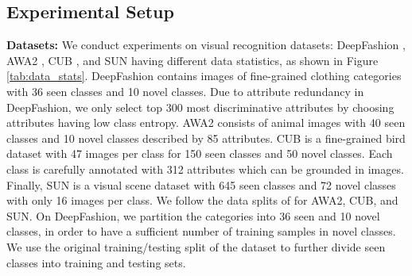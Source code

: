 \documentclass[10pt,journal,compsoc]{IEEEtran}
\newcommand{\1}{\boldsymbol{1}}
\newcommand{\0}{\boldsymbol{0}}
\newcommand{\<}{\langle}
\renewcommand{\>}{\rangle}
\newcommand{\myparagraph}[1]{\vspace{-2pt}\medskip\noindent\textbf{#1}}
\begin{document}
\subsection{Experimental Setup}
\myparagraph{Datasets:}
We conduct experiments on visual recognition datasets: DeepFashion \cite{Liu:CVPR16}, AWA2 \cite{Xian:PAMI18}, CUB \cite{Welinder:report10}, and SUN \cite{Patterson:CVPR12} having different data statistics, as shown in Figure \ref{tab:data_stats}.
DeepFashion \cite{Liu:CVPR16} contains images of fine-grained clothing categories with 36 seen classes and 10 novel classes.
Due to attribute redundancy in DeepFashion, we only select top 300 most discriminative attributes by choosing attributes having low class entropy.
AWA2 \cite{Xian:PAMI18} consists of animal images with 40 seen classes and 10 novel classes described by 85 attributes.
CUB \cite{Welinder:report10} is a fine-grained bird dataset with 47 images per class for 150 seen classes and 50 novel classes. Each class is carefully annotated with 312 attributes which can be grounded in images.
Finally, SUN \cite{Patterson:CVPR12} is a visual scene dataset with 645 seen classes and 72 novel classes with only 16 images per class. 
We follow the data splits of \cite{Xian:PAMI18} for AWA2, CUB, and SUN.
On DeepFashion, we partition the categories into 36 seen and 10 novel classes, in order to have a sufficient number of training samples in novel classes.
We use the original training/testing split of the dataset to further divide seen classes into training and testing sets.

\begin{table}[t]
\centering
{}
\caption{\small{Statistics of the datasets used in our experiments.}}
\label{tab:data_stats}
\vspace{-5mm}
\end{table}
\end{document}
